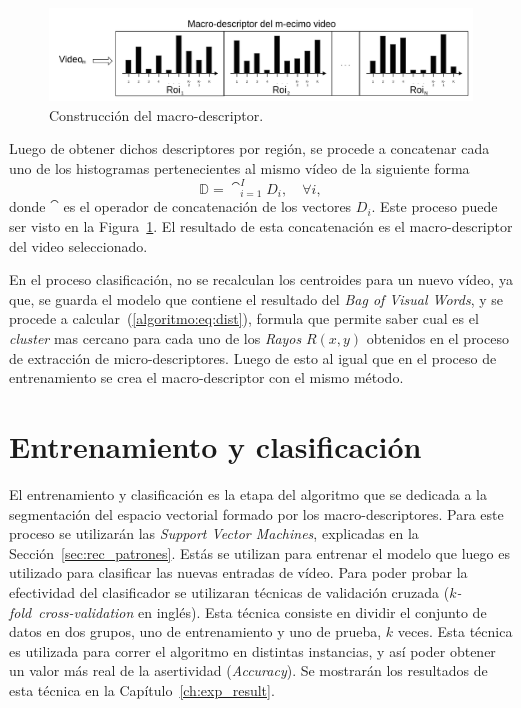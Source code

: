	\begin{figure}[bt]
		\centering
		\includegraphics[width=1\textwidth]{Figuras/Diagramas/macro-descriptor.png}
		\caption{Construcción del macro-descriptor.}
		\label{algoritmo:fig:macrodescriptores}
	\end{figure}	

	Luego de obtener dichos descriptores por región, se procede a concatenar cada uno de los histogramas pertenecientes al mismo vídeo de la siguiente forma
	\begin{equation}
		\mathds{D} = \cat_{i = 1}^{I} D_i, \quad \forall i,
	\end{equation}	   
   donde $\cat$ es el operador de concatenación de los vectores $D_i$. Este proceso puede ser visto en la Figura~\ref{algoritmo:fig:macrodescriptores}. El resultado de esta concatenación es el macro-descriptor del video seleccionado.
   


	En el proceso clasificación, no se recalculan los centroides para un nuevo vídeo, ya que, se guarda el modelo que contiene el resultado del \textit{Bag of Visual Words}, y se procede a calcular~(\ref{algoritmo:eq:dist}), formula que permite saber cual es el \textit{cluster} mas cercano para cada uno de los \textit{Rayos} $R(x,y)$ obtenidos en el proceso de extracción de micro-descriptores. Luego de esto al igual que en el proceso de entrenamiento se crea el macro-descriptor con el mismo método.
	
	
\section{Entrenamiento y clasificación}
\label{sec:clasificacion}
El entrenamiento y clasificación es la etapa del algoritmo que se dedicada a la segmentación del espacio vectorial formado por los macro-descriptores. Para este proceso se utilizarán las \textit{Support Vector Machines}, explicadas en la Sección~\ref{sec:rec_patrones}. Estás se utilizan para entrenar el modelo que luego es utilizado para clasificar las nuevas entradas de vídeo. 
Para poder probar la efectividad del clasificador se utilizaran técnicas de validación cruzada ($k$\textit{-fold~cross-validation} en inglés). Esta técnica consiste en dividir el conjunto de datos en dos grupos, uno de entrenamiento y uno de prueba, $k$ veces. Esta técnica es utilizada para correr el algoritmo en distintas instancias, y así poder obtener un valor más real de la asertividad (\textit{Accuracy}). Se mostrarán los resultados de esta técnica en la Capítulo~\ref{ch:exp_result}.


